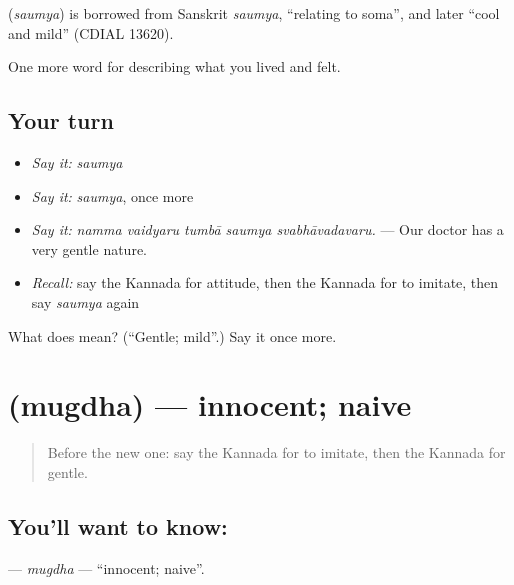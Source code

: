 \begin{cousinweb}
\textbf{} (\emph{saumya}) is borrowed from Sanskrit \emph{saumya}, \textquotedblleft{}relating to soma\textquotedblright{}, and later \textquotedblleft{}cool and mild\textquotedblright{} (CDIAL 13620).
\end{cousinweb}

\begin{grammarlens}[title={What you've built}]
One more word for describing what you lived and felt.
\end{grammarlens}

\subsection*{Your turn}
\begin{itemize}
\raggedright
  \item \emph{Say it:} \emph{saumya}
  \item \emph{Say it:} \emph{saumya}, once more
  \item \emph{Say it:} \emph{namma vaidyaru tumbā saumya svabhāvadavaru.} — Our doctor has a very gentle nature.
  \item \emph{Recall:} say the Kannada for attitude, then the Kannada for to imitate, then say \emph{saumya} again
\end{itemize}

\begin{tcolorbox}[breakable,colback=teal!4,colframe=teal!35!black,title={Before you move on}]
What does  mean? (\textquotedblleft{}Gentle; mild\textquotedblright{}.) Say it once more.
\end{tcolorbox}
\section[\texorpdfstring{\kn{ಮುಗ್ಧ} (mugdha)}{ಮುಗ್ಧ (mugdha)}]{ (mugdha) — innocent; naive}

\label{lesson:KA-C501-mugdha}



\begin{quote}
Before the new one: say the Kannada for to imitate, then the Kannada for gentle.
\end{quote}

\subsection*{You'll want to know: }
\textbf{} — \emph{mugdha} — \textquotedblleft{}innocent; naive\textquotedblright{}.

